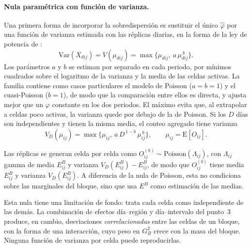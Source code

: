 \paragraph{Nula paramétrica con función de varianza.} Una primera forma de
incorporar la sobredispersión es sustituir el único $\hat\varphi$ por una
función de varianza estimada con las réplicas diarias, en la forma de la ley de
potencia de \cite{Taylor1961}:
\begin{equation}\label{eq:prop-varianza}
  \mathrm{Var}(X_{dij}) = V(\mu_{dij}) = \max\bigl\{\mu_{dij},\ a\,\mu_{dij}^{\,b}\bigr\}.
\end{equation}
Los parámetros $a$ y $b$ se estiman por separado en cada periodo, por mínimos
cuadrados sobre el logaritmo de la varianza y la media de las celdas activas.
La familia contiene como casos particulares el modelo de Poisson ($a=b=1$) y el
cuasi-Poisson ($b=1$), de modo que la comparación entre ellos es directa, y
ajusta mejor que un $\varphi$ constante en los dos periodos. El máximo evita
que, al extrapolar a celdas poco activas, la varianza quede por debajo de la de
Poisson. Si los $D$ días son independientes y tienen la misma media, el conteo
agregado tiene varianza
\begin{equation}\label{eq:prop-varianza-D}
  V_D(\mu_{ij}) = \max\bigl\{\mu_{ij},\ a\,D^{\,1-b}\,\mu_{ij}^{\,b}\bigr\},
  \qquad \mu_{ij} = \mathrm{E}[O_{ij}] .
\end{equation}

Las réplicas se generan celda por celda como
$O^{(b)}_{ij}\sim\mathrm{Poisson}(\Lambda_{ij})$, con $\Lambda_{ij}$ gamma de
media $E^B_{ij}$ y varianza $V_D(E^B_{ij}) - E^B_{ij}$, de modo que
$O^{(b)}_{ij}$ tiene media $E^B_{ij}$ y varianza $V_D(E^B_{ij})$. A diferencia de
la nula de Poisson, esta no condiciona sobre las marginales del bloque, sino que
usa $E^B$ como estimación de las medias.

Esta nula tiene una limitación de fondo: trata cada celda como independiente de
las demás. La combinación de efectos día--región y día--intervalo del punto~3
produce, en cambio, desviaciones \emph{correlacionadas} entre las celdas de un
bloque, con la forma de una interacción, cuyo peso en $G^2_B$ crece con la masa
del bloque. Ninguna función de varianza por celda puede reproducirlas.

